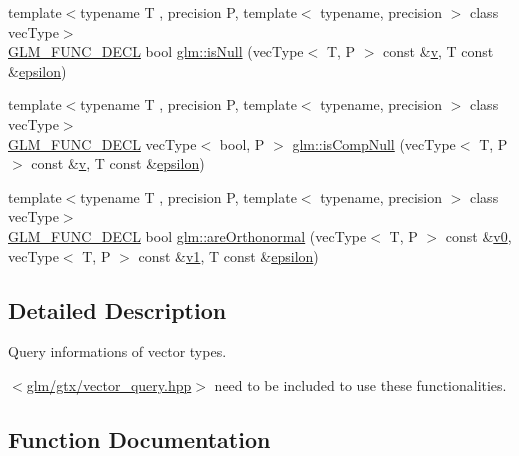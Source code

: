 \begin{DoxyCompactItemize}
\item 
{\footnotesize template$<$typename T , precision P, template$<$ typename, precision $>$ class vec\+Type$>$ }\\\mbox{\hyperlink{setup_8hpp_ab2d052de21a70539923e9bcbf6e83a51}{G\+L\+M\+\_\+\+F\+U\+N\+C\+\_\+\+D\+E\+CL}} bool \mbox{\hyperlink{group__gtx__vector__query_ga81a64edc1a2b470b82896592e89c523b}{glm\+::is\+Null}} (vec\+Type$<$ T, P $>$ const \&\mbox{\hyperlink{glad_8h_a14cfbe2fc2234f5504618905b69d1e06}{v}}, T const \&\mbox{\hyperlink{group__gtc__constants_ga2a1e57fc5592b69cfae84174cbfc9429}{epsilon}})
\item 
{\footnotesize template$<$typename T , precision P, template$<$ typename, precision $>$ class vec\+Type$>$ }\\\mbox{\hyperlink{setup_8hpp_ab2d052de21a70539923e9bcbf6e83a51}{G\+L\+M\+\_\+\+F\+U\+N\+C\+\_\+\+D\+E\+CL}} vec\+Type$<$ bool, P $>$ \mbox{\hyperlink{group__gtx__vector__query_ga93ecd4137480483ce1af0de8bbbf6546}{glm\+::is\+Comp\+Null}} (vec\+Type$<$ T, P $>$ const \&\mbox{\hyperlink{glad_8h_a14cfbe2fc2234f5504618905b69d1e06}{v}}, T const \&\mbox{\hyperlink{group__gtc__constants_ga2a1e57fc5592b69cfae84174cbfc9429}{epsilon}})
\item 
{\footnotesize template$<$typename T , precision P, template$<$ typename, precision $>$ class vec\+Type$>$ }\\\mbox{\hyperlink{setup_8hpp_ab2d052de21a70539923e9bcbf6e83a51}{G\+L\+M\+\_\+\+F\+U\+N\+C\+\_\+\+D\+E\+CL}} bool \mbox{\hyperlink{group__gtx__vector__query_ga89c82bc60e5b84e4489b74c15a134caf}{glm\+::are\+Orthonormal}} (vec\+Type$<$ T, P $>$ const \&\mbox{\hyperlink{glad_8h_a7062a23d1d434121d4a88f530703d06a}{v0}}, vec\+Type$<$ T, P $>$ const \&\mbox{\hyperlink{glad_8h_a0779c3b73f9aa3a0ac5b0139b5d291d9}{v1}}, T const \&\mbox{\hyperlink{group__gtc__constants_ga2a1e57fc5592b69cfae84174cbfc9429}{epsilon}})
\end{DoxyCompactItemize}


\subsection{Detailed Description}
Query informations of vector types. 

$<$\mbox{\hyperlink{vector__query_8hpp}{glm/gtx/vector\+\_\+query.\+hpp}}$>$ need to be included to use these functionalities. 

\subsection{Function Documentation}
\mbox{\label{group__gtx__vector__query_ga465b844190d1740051e45d780832ea4c}} 
